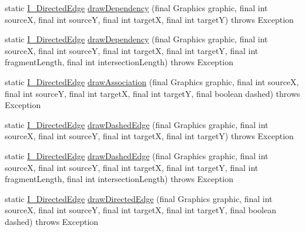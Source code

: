 \begin{DoxyCompactItemize}
\item 
static \hyperlink{interfaceorg_1_1tzi_1_1use_1_1gui_1_1views_1_1diagrams_1_1edges_1_1_i___directed_edge}{I\-\_\-\-Directed\-Edge} \hyperlink{classorg_1_1tzi_1_1use_1_1gui_1_1views_1_1diagrams_1_1edges_1_1_directed_edge_factory_aa63881bd4c4e943f63678b7b16628156}{draw\-Dependency} (final Graphics graphic, final int source\-X, final int source\-Y, final int target\-X, final int target\-Y)  throws Exception 
\item 
static \hyperlink{interfaceorg_1_1tzi_1_1use_1_1gui_1_1views_1_1diagrams_1_1edges_1_1_i___directed_edge}{I\-\_\-\-Directed\-Edge} \hyperlink{classorg_1_1tzi_1_1use_1_1gui_1_1views_1_1diagrams_1_1edges_1_1_directed_edge_factory_af36e5667dbfbe0f51c1b2bc9a895b434}{draw\-Dependency} (final Graphics graphic, final int source\-X, final int source\-Y, final int target\-X, final int target\-Y, final int fragment\-Length, final int intersection\-Length)  throws Exception 
\item 
static \hyperlink{interfaceorg_1_1tzi_1_1use_1_1gui_1_1views_1_1diagrams_1_1edges_1_1_i___directed_edge}{I\-\_\-\-Directed\-Edge} \hyperlink{classorg_1_1tzi_1_1use_1_1gui_1_1views_1_1diagrams_1_1edges_1_1_directed_edge_factory_ac636cea6cc55e8936fed9783cc546681}{draw\-Association} (final Graphics graphic, final int source\-X, final int source\-Y, final int target\-X, final int target\-Y, final boolean dashed)  throws Exception 
\item 
static \hyperlink{interfaceorg_1_1tzi_1_1use_1_1gui_1_1views_1_1diagrams_1_1edges_1_1_i___directed_edge}{I\-\_\-\-Directed\-Edge} \hyperlink{classorg_1_1tzi_1_1use_1_1gui_1_1views_1_1diagrams_1_1edges_1_1_directed_edge_factory_a41a13a0af8f428820ec833abf50ba344}{draw\-Dashed\-Edge} (final Graphics graphic, final int source\-X, final int source\-Y, final int target\-X, final int target\-Y)  throws Exception 
\item 
static \hyperlink{interfaceorg_1_1tzi_1_1use_1_1gui_1_1views_1_1diagrams_1_1edges_1_1_i___directed_edge}{I\-\_\-\-Directed\-Edge} \hyperlink{classorg_1_1tzi_1_1use_1_1gui_1_1views_1_1diagrams_1_1edges_1_1_directed_edge_factory_af4616951b7d2fdbe4ca484521117e726}{draw\-Dashed\-Edge} (final Graphics graphic, final int source\-X, final int source\-Y, final int target\-X, final int target\-Y, final int fragment\-Length, final int intersection\-Length)  throws Exception 
\item 
static \hyperlink{interfaceorg_1_1tzi_1_1use_1_1gui_1_1views_1_1diagrams_1_1edges_1_1_i___directed_edge}{I\-\_\-\-Directed\-Edge} \hyperlink{classorg_1_1tzi_1_1use_1_1gui_1_1views_1_1diagrams_1_1edges_1_1_directed_edge_factory_a9c21a1e21e23c50af9af722597ac14f8}{draw\-Directed\-Edge} (final Graphics graphic, final int source\-X, final int source\-Y, final int target\-X, final int target\-Y, final boolean dashed)  throws Exception 

\end{DoxyCompactItemize}
